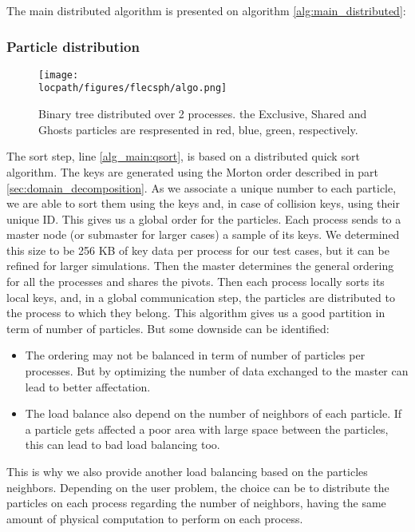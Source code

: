 The main distributed algorithm is presented on algorithm \ref{alg:main_distributed}:

\subsubsection{Particle distribution}

\begin{figure*}
\centering
\texttt{[image: \\locpath/figures/flecsph/algo.png]}
\caption[Binary tree and distribution over two processes]{Binary tree distributed over 2 processes. the Exclusive, Shared and Ghosts particles  are respresented in red, blue, green, respectively.}
\label{fig:big_tree}
\end{figure*}

The sort step, line \ref{alg_main:qsort}, is based on a distributed quick sort algorithm. 
The keys are generated using the Morton order described in part \ref{sec:domain_decomposition}. 
As we associate a unique number to each particle, we are able to sort them using the keys and, in case of collision keys, using their unique ID. 
This gives us a global order for the particles. 
Each process sends to a master node (or submaster for larger cases) a sample of its keys. 
We determined this size to be 256 KB of key data per process for our test cases, but it can be refined for larger simulations. 
Then the master determines the general ordering for all the processes and shares the pivots. 
Then each process locally sorts its local keys, and, in a global communication step, the particles are distributed to the process to which they belong. 
This algorithm gives us a good partition in term of number of particles. 
But some downside can be identified:
\begin{itemize}
	\item The ordering may not be balanced in term of number of particles per processes. But by optimizing the number of data exchanged to the master can lead to better affectation. 
	\item The load balance also depend on the number of neighbors of each particle. If a particle gets affected a poor area with large space between the particles, this can lead to bad load balancing too. 
\end{itemize}
This is why we also provide another load balancing based on the particles neighbors. 
Depending on the user problem, the choice can be to distribute the particles on each process regarding the number of neighbors, having the same amount of physical computation to perform on each process. 

